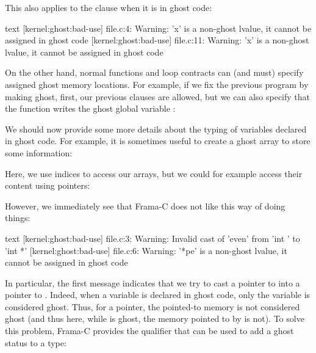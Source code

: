 This also applies to the  clause when it is
in ghost code:




\begin{CodeBlock}{text}
[kernel:ghost:bad-use] file.c:4: Warning:
  'x' is a non-ghost lvalue, it cannot be assigned in ghost code
[kernel:ghost:bad-use] file.c:11: Warning:
  'x' is a non-ghost lvalue, it cannot be assigned in ghost code
\end{CodeBlock}


On the other hand, normal functions and loop contracts can (and
must) specify assigned ghost memory locations. For example, if we
fix the previous program by making  ghost, first, our
previous  clauses are allowed, but we can also
specify that the function  writes the ghost global
variable :






We should now provide some more details about the typing of variables
declared in ghost code. For example, it is sometimes useful to create
a ghost array to store some information:




Here, we use indices to access our arrays, but we could for example
access their content using pointers:




However, we immediately see that Frama-C does not like this way of
doing things:


\begin{CodeBlock}{text}
[kernel:ghost:bad-use] file.c:3: Warning:
  Invalid cast of 'even' from 'int \ghost *' to 'int *'
[kernel:ghost:bad-use] file.c:6: Warning:
  '*pe' is a non-ghost lvalue, it cannot be assigned in ghost code
\end{CodeBlock}


In particular, the first message indicates that we try to cast
a pointer to  into a pointer
to . Indeed, when a variable is declared in ghost
code, only the variable is considered ghost. Thus, for a pointer,
the pointed-to memory is not considered ghost (and thus here, while
 is ghost, the memory pointed to by  is
not). To solve this problem, Frama-C provides the
 qualifier that can be used to
add a ghost status to a type:


